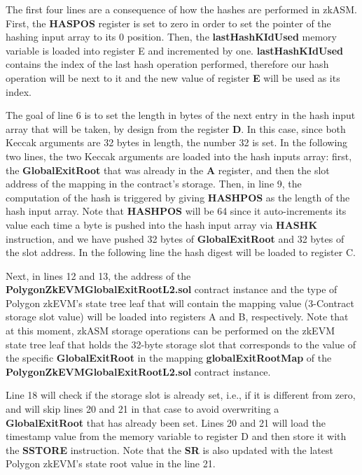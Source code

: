 The first four lines are a consequence of how the hashes are performed in zkASM. First, the \textbf{HASPOS} register is set to zero in order to set the pointer of the hashing input array to its 0 position. Then, the \textbf{lastHashKIdUsed} memory variable is loaded into register E and incremented by one. \textbf{lastHashKIdUsed} contains the index of the last hash operation performed, therefore our hash operation will be next to it and the new value of register \textbf{E} will be used as its index.

The goal of line 6 is to set the length in bytes of the next entry in the hash input array that will be taken, by design from the register \textbf{D}. In this case, since both Keccak arguments are 32 bytes in length, the number 32 is set. In the following two lines, the two Keccak arguments are loaded into the hash inputs array: first, the \textbf{GlobalExitRoot} that was already in the \textbf{A} register, and then the slot address of the mapping in the contract's storage. Then, in line 9, the computation of the hash is triggered by giving \textbf{HASHPOS} as the length of the hash input array. Note that \textbf{HASHPOS} will be 64 since it auto-increments its value each time a byte is pushed into the hash input array via \textbf{HASHK} instruction, and we have pushed 32 bytes of \textbf{GlobalExitRoot} and 32 bytes of the slot address. In the following line the hash digest will be loaded to register C.

Next, in lines 12 and 13, the address of the \textbf{PolygonZkEVMGlobalExitRootL2.sol} contract instance and the type of Polygon zkEVM's state tree leaf that will contain the mapping value (3-Contract storage slot value) will be loaded into registers A and B, respectively. Note that at this moment, zkASM storage operations can be performed on the zkEVM state tree leaf that holds the 32-byte storage slot that corresponds to the value of the specific \textbf{GlobalExitRoot} in the mapping \textbf{globalExitRootMap} of the \textbf{PolygonZkEVMGlobalExitRootL2.sol} contract instance.

Line 18 will check if the storage slot is already set, i.e., if it is different from zero, and will skip lines 20 and 21 in that case to avoid overwriting a \textbf{GlobalExitRoot} that has already been set. Lines 20 and 21 will load the timestamp value from the memory variable to register D and then store it with the \textbf{SSTORE} instruction. Note that the \textbf{SR} is also updated with the latest Polygon zkEVM's state root value in the line 21.

